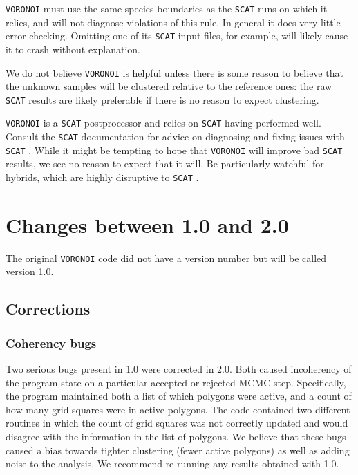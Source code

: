 \documentclass[10pt,titlepage,times,letterpaper]{article}
\def\SCAT{{\tt SCAT} }
\def\VORONOI{{\tt VORONOI} }
\begin{document}
\VORONOI must use the same species boundaries as the \SCAT runs on which it relies, and
will not diagnose violations of this rule.  In general it does very little error
checking.  Omitting one of its \SCAT input files, for example, will likely cause it to
crash without explanation.

We do not believe \VORONOI is helpful unless there is some reason to believe that the
unknown samples will be clustered relative to the reference ones:  the raw \SCAT results
are likely preferable if there is no reason to expect clustering.

\VORONOI is a \SCAT postprocessor and relies on \SCAT having performed well.
Consult the \SCAT documentation for advice on diagnosing and fixing issues with \SCAT.
While it might be tempting to hope that \VORONOI will improve bad \SCAT results, we
see no reason to expect that it will.  Be particularly watchful for hybrids, which are
highly disruptive to \SCAT.

\section{Changes between 1.0 and 2.0} \label{changes2_0}

The original \VORONOI code did not have a version number but will be called version 1.0.

\subsection{Corrections}

\subsubsection{Coherency bugs}  
Two serious bugs present in 1.0 were corrected in 2.0.  Both 
caused incoherency of the program state on a particular accepted or rejected MCMC
step.  Specifically, the program maintained both a list of which polygons were
active, and a count of how many grid squares were in active polygons.
The code contained two different routines in which the count of grid squares was not 
correctly updated and would
disagree with the information in the list of polygons.  We believe that these bugs 
caused a bias towards tighter clustering (fewer active polygons) as well as
adding noise to the analysis.  We recommend re-running any results obtained with 1.0.
\end{document}
